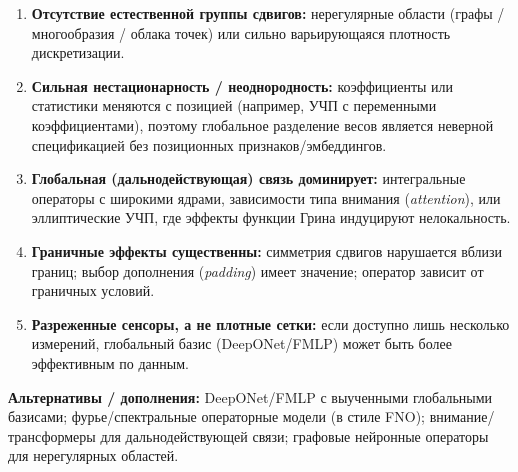 \documentclass[../NDCNNAI_main.tex]{subfiles}
\begin{document}
\begin{enumerate}
    \item \textbf{Отсутствие естественной группы сдвигов:} нерегулярные области (графы / многообразия / облака точек) или сильно варьирующаяся плотность дискретизации.
    
    \item \textbf{Сильная нестационарность / неоднородность:} коэффициенты или статистики меняются с позицией (например, УЧП с переменными коэффициентами), поэтому глобальное разделение весов является неверной спецификацией без позиционных признаков/эмбеддингов.
    
    \item \textbf{Глобальная (дальнодействующая) связь доминирует:} интегральные операторы с широкими ядрами, зависимости типа внимания (\emph{attention}), или эллиптические УЧП, где эффекты функции Грина индуцируют нелокальность.
    
    \item \textbf{Граничные эффекты существенны:} симметрия сдвигов нарушается вблизи границ; выбор дополнения (\emph{padding}) имеет значение; оператор зависит от граничных условий.
    
    \item \textbf{Разреженные сенсоры, а не плотные сетки:} если доступно лишь несколько измерений, глобальный базис (DeepONet/FMLP) может быть более эффективным по данным.
\end{enumerate}

\textbf{Альтернативы / дополнения:} DeepONet/FMLP с выученными глобальными базисами; фурье/спектральные операторные модели (в стиле FNO); внимание/трансформеры для дальнодействующей связи; графовые нейронные операторы для нерегулярных областей.
\end{document}
